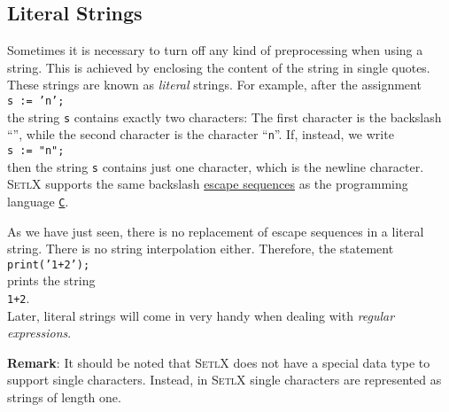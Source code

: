 \subsection{Literal Strings}
Sometimes it is necessary to turn off any kind of preprocessing when using a string.  This
is achieved by enclosing the content of the string in single quotes.  These strings are
known as \emph{literal} strings.  For example, after
the assignment
\\[0.2cm]
\hspace*{1.3cm}
\texttt{s := 'n';}
\\[0.2cm]
the string \texttt{s} contains exactly two characters:  The first character is the
backslash ``\texttt{}'', while the second character is the character ``\texttt{n}''.
If, instead, we write
\\[0.2cm]
\hspace*{1.3cm}
\texttt{s := "n";}
\\[0.2cm]
then the string \texttt{s} contains just one character, which is the newline character.
\textsc{SetlX} supports the same backslash \href{https://en.wikipedia.org/wiki/Escape_sequences_in_C}{escape sequences} 
as the programming language \href{https://en.wikipedia.org/wiki/C_(programming_language)}{\texttt{C}}. 

As we have just seen, there is no replacement of escape sequences in a literal string.
There is no string interpolation either.  Therefore, the statement
\\[0.2cm]
\hspace*{1.3cm}
\texttt{print('1+2');}
\\[0.2cm]
prints the string 
\\[0.2cm]
\hspace*{1.3cm}
\texttt{1+2}.
\\[0.2cm]
Later, literal strings will come in very handy when dealing with \emph{regular expressions}.
\vspace*{0.2cm}

\noindent
\textbf{Remark}:
It should be noted that \textsc{SetlX} does not have a special data type to support single characters.
Instead, in \textsc{SetlX} single characters are represented as strings of length one. 

